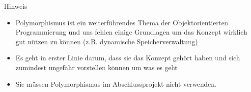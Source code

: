 \documentclass[presentation]{beamer}
\begin{document}
\begin{frame}[label={sec:org9f908ee}]{Hinweis}
\begin{itemize}
\item \alert{Polymorphismus} ist ein weiterführendes Thema der
Objektorientierten Programmierung und uns fehlen einige Grundlagen
um das Konzept wirklich gut nützen zu können (z.B. dynamische
Speicherverwaltung)
\item Es geht in erster Linie darum, \alert{dass sie das Konzept gehört haben}
und sich zumindest ungefähr vorstellen können um was es geht
\item Sie müssen Polymorphismus im Abschlussprojekt nicht verwenden.
\end{itemize}
\end{frame}
\end{document}
